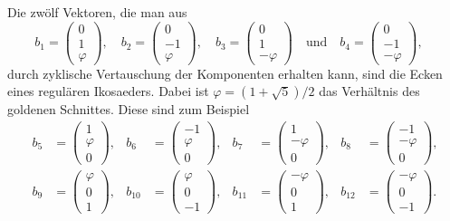 Die zwölf Vektoren, die man aus 
\[
b_1=\begin{pmatrix} 0\\  1\\  \varphi \end{pmatrix},\quad
b_2=\begin{pmatrix} 0\\ -1\\  \varphi \end{pmatrix},\quad
b_3=\begin{pmatrix} 0\\  1\\ -\varphi \end{pmatrix}
\quad\text{und}\quad
b_4=\begin{pmatrix} 0\\ -1\\ -\varphi
\end{pmatrix},\quad
\]
durch zyklische Vertauschung der Komponenten erhalten kann, sind
die Ecken eines regulären Ikosaeders.
Dabei ist $\varphi=(1+\sqrt{5})/2$ das Verhältnis des goldenen
Schnittes.
Diese sind zum Beispiel
\[
\begin{aligned}
b_5&=\begin{pmatrix} 1\\\varphi\\0\end{pmatrix},&
b_6&=\begin{pmatrix}-1\\\varphi\\0\end{pmatrix},&
b_7&=\begin{pmatrix} 1\\-\varphi\\0\end{pmatrix},&
b_8&=\begin{pmatrix}-1\\-\varphi\\0\end{pmatrix},
\\
b_9   &=\begin{pmatrix} \varphi\\0\\ 1\end{pmatrix},&
b_{10}&=\begin{pmatrix} \varphi\\0\\-1\end{pmatrix},&
b_{11}&=\begin{pmatrix}-\varphi\\0\\ 1\end{pmatrix},&
b_{12}&=\begin{pmatrix}-\varphi\\0\\-1\end{pmatrix}.
\end{aligned}
\]
